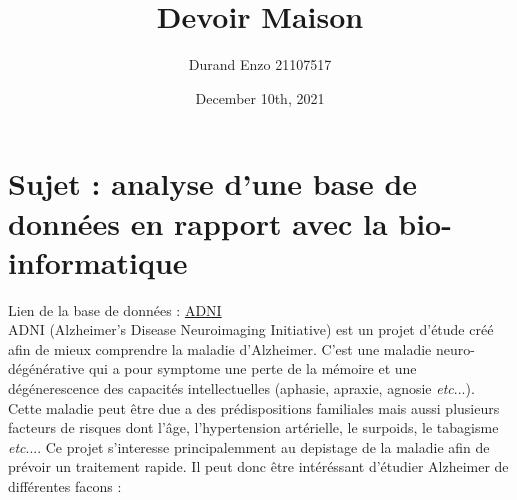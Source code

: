 \documentclass[
	12pt, %
]{fphw}
\title{Devoir Maison} %
\author{Durand Enzo 21107517} %
\date{December 10th, 2021} %
\institute{Sorbonne Université} %
\begin{document}
\maketitle %


\section*{Sujet : analyse d'une base de données en rapport avec la bio-informatique}

Lien de la base de données : \href{http://adni.loni.usc.edu/data-samples/data-types/}{ADNI}\\

ADNI (Alzheimer's Disease Neuroimaging Initiative) est un projet d'étude créé afin de mieux comprendre la maladie d'Alzheimer. C'est une maladie neuro-dégénérative qui a pour symptome une perte de la mémoire et une dégénerescence des capacités intellectuelles (aphasie, apraxie, agnosie \textit{etc}...). Cette maladie peut être due a des prédispositions familiales mais aussi plusieurs facteurs de risques dont l'âge, l'hypertension artérielle, le surpoids, le tabagisme \textit{etc}.... Ce projet s'interesse principalemment au depistage de la maladie afin de prévoir un traitement rapide. Il peut donc être intéréssant d'étudier Alzheimer de différentes facons :
\end{document}
